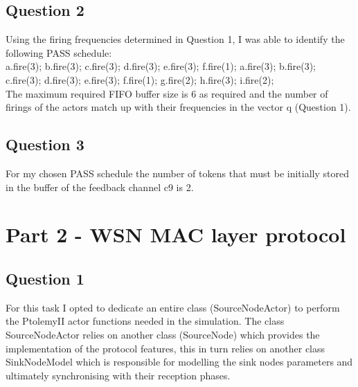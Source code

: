\documentclass[12pt]{article} %
\begin{document}
\subsection{Question 2} %
Using the firing frequencies determined in Question 1, I was able to identify the following PASS schedule: \\

a.fire(3); b.fire(3); c.fire(3); d.fire(3); e.fire(3); f.fire(1); a.fire(3); b.fire(3); c.fire(3); d.fire(3); e.fire(3); f.fire(1); g.fire(2); h.fire(3); i.fire(2);
\\

The maximum required FIFO buffer size is 6 as required and the number of firings of the actors match up with their frequencies in the vector q (Question 1).


\subsection{Question 3} %
For my chosen PASS schedule the number of tokens that must be initially stored in the buffer of the feedback channel c9 is 2.




\section{Part 2 - WSN MAC layer protocol} %



\subsection{Question 1} %
For this task I opted to dedicate an entire class (SourceNodeActor) to perform the PtolemyII actor functions needed in the simulation. The class SourceNodeActor relies on another class (SourceNode) which provides the implementation of the protocol features, this in turn relies on another class SinkNodeModel which is responsible for modelling the sink nodes parameters and ultimately synchronising with their reception phases.
\\
\end{document}

